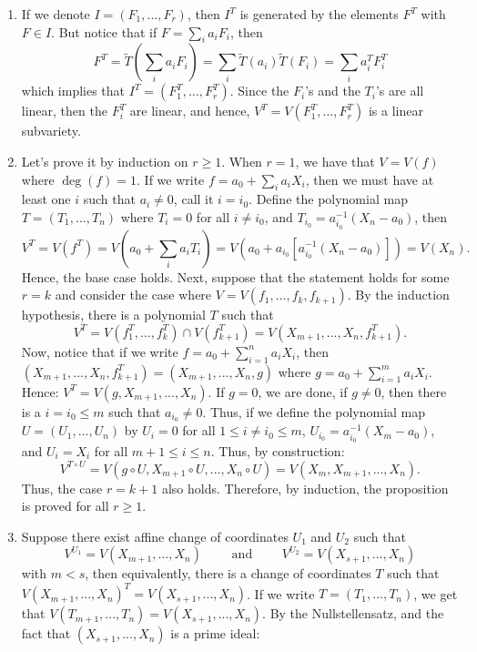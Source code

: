 \begin{solution}
    \begin{enumerate}[label=(\alph*)]
        \item If we denote $I = (F_1, ..., F_r)$, then $I^T$ is generated by the elements $F^T$ with $F \in I$. But notice that if $F = \sum_i a_iF_i$, then
        $$F^T = \tilde{T}(\sum_i a_iF_i) = \sum_i \tilde{T}(a_i)\tilde{T}(F_i) = \sum_i a_i^T F_i^T$$
        which implies that $I^T = (F_1^T, ..., F_r^T)$. Since the $F_i$'s and the $T_i$'s are all linear, then the $F_i^T$ are linear, and hence, $V^T = V(F_1^T, ..., F_r^T)$ is a linear subvariety.
        \item Let's prove it by induction on $r\geq 1$. When $r = 1$, we have that $V = V(f)$ where $\deg(f) = 1$. If we write $f = a_0 + \sum_i a_iX_i$, then we must have at least one $i$ such that $a_i \neq 0$, call it $i = i_0$. Define the polynomial map $T = (T_1, ..., T_n)$ where $T_i = 0$ for all $i \neq i_0$, and $T_{i_0} = a_{i_0}^{-1}(X_n - a_0)$, then
        $$V^T = V(f^T) = V\left(a_0 + \sum_i a_iT_i\right) = V\left(a_0 + a_{i_0}[a_{i_0}^{-1}(X_n - a_0)]\right) = V(X_n).$$
        Hence, the base case holds. Next, suppose that the statement holds for some $r = k$ and consider the case where $V = V(f_1, \dots, f_k, f_{k+1})$. By the induction hypothesis, there is a polynomial $T$ such that
        $$V^T = V(f_1^T, \dots, f_k^T)\cap V(f_{k+1}^T) = V(X_{m+1}, ..., X_n, f_{k+1}^T).$$
        Now, notice that if we write $f = a_0 + \sum_{i=1}^{n}a_i X_i$, then $(X_{m+1}, ..., X_n, f_{k+1}^T) = (X_{m+1}, ..., X_n, g)$ where $g = a_0 + \sum_{i=1}^{m}a_i X_i$. Hence: $V^T = V(g, X_{m+1}, ..., X_n)$. If $g = 0$, we are done, if $g \neq 0$, then there is a $i = i_0 \leq m$ such that $a_{i_0} \neq 0$. Thus, if we define the polynomial map $U = (U_1, ..., U_n)$ by $U_i = 0$ for all $1\leq i\neq i_0 \leq m$, $U_{i_0} = a_{i_0}^{-1}(X_m - a_0)$, and $U_i = X_i$ for all $m+1 \leq i \leq n$. Thus, by construction:
        $$V^{T\circ U} = V(g\circ U, X_{m+1}\circ U, ..., X_n \circ U) = V(X_m, X_{m+1}, ..., X_n).$$
        Thus, the case $r = k+1$ also holds. Therefore, by induction, the proposition is proved for all $r \geq 1$.
        \item Suppose there exist affine change of coordinates $U_1$ and $U_2$ such that
        $$V^{U_1} = V(X_{m+1}, \dots, X_n) \qquad \text{ and } \qquad V^{U_2} = V(X_{s+1}, \dots, X_n)$$
        with $m < s$, then equivalently, there is a change of coordinates $T$ such that $V(X_{m+1}, ..., X_n)^T = V(X_{s+1}, ..., X_n)$. If we write $T = (T_1, ..., T_n)$, we get that $V(T_{m+1}, ..., T_n) = V(X_{s+1}, ..., X_n)$. By the Nullstellensatz, and the fact that $(X_{s+1}, ..., X_n)$ is a prime ideal:

\end{enumerate}
\end{solution}
